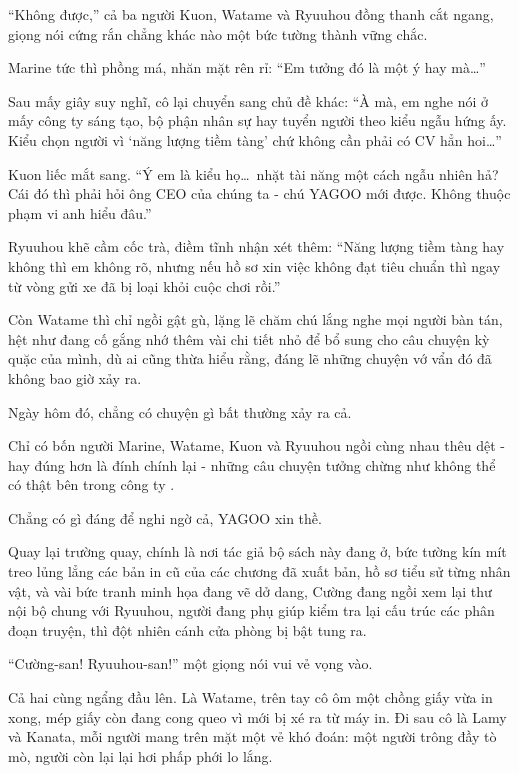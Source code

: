\documentclass[../main.tex]{subfiles}
\begin{document}
``Không được,'' cả ba người Kuon, Watame và Ryuuhou đồng thanh cắt ngang, giọng nói cứng rắn chẳng khác nào một bức tường thành vững chắc.

Marine tức thì phồng má, nhăn mặt rên rỉ: ``Em tưởng đó là một ý hay mà\dots''

Sau mấy giây suy nghĩ, cô lại chuyển sang chủ đề khác: ``À mà, em nghe nói ở mấy công ty sáng tạo, bộ phận nhân sự hay tuyển người theo kiểu ngẫu hứng ấy. Kiểu chọn người vì `năng lượng tiềm tàng' chứ không cần phải có CV hẳn hoi\dots''

Kuon liếc mắt sang. ``Ý em là kiểu họ\dots\ nhặt tài năng một cách ngẫu nhiên hả? Cái đó thì phải hỏi ông CEO của chúng ta - chú YAGOO mới được. Không thuộc phạm vi anh hiểu đâu.''

Ryuuhou khẽ cầm cốc trà, điềm tĩnh nhận xét thêm: ``Năng lượng tiềm tàng hay không thì em không rõ, nhưng nếu hồ sơ xin việc không đạt tiêu chuẩn thì ngay từ vòng gửi xe đã bị loại khỏi cuộc chơi rồi.''

Còn Watame thì chỉ ngồi gật gù, lặng lẽ chăm chú lắng nghe mọi người bàn tán, hệt như đang cố gắng nhớ thêm vài chi tiết nhỏ để bổ sung cho câu chuyện kỳ quặc của mình, dù ai cũng thừa hiểu rằng, đáng lẽ những chuyện vớ vẩn đó đã không bao giờ xảy ra.

Ngày hôm đó, chẳng có chuyện gì bất thường xảy ra cả.

Chỉ có bốn người Marine, Watame, Kuon và Ryuuhou ngồi cùng nhau thêu dệt - hay đúng hơn là đính chính lại - những câu chuyện tưởng chừng như không thể có thật bên trong công ty \hll.

Chẳng có gì đáng để nghi ngờ cả, YAGOO xin thề.

\ct

Quay lại trường quay, chính là nơi tác giả bộ sách này đang ở, bức tường kín mít treo lủng lẳng các bản in cũ của các chương đã xuất bản, hồ sơ tiểu sử từng nhân vật, và vài bức tranh minh họa đang vẽ dở dang, Cường đang ngồi xem lại thư nội bộ chung với Ryuuhou, người đang phụ giúp kiểm tra lại cấu trúc các phân đoạn truyện, thì đột nhiên cánh cửa phòng bị bật tung ra.

``Cường-san! Ryuuhou-san!'' một giọng nói vui vẻ vọng vào.

Cả hai cùng ngẩng đầu lên. Là Watame, trên tay cô ôm một chồng giấy vừa in xong, mép giấy còn đang cong queo vì mới bị xé ra từ máy in. Đi sau cô là Lamy và Kanata, mỗi người mang trên mặt một vẻ khó đoán: một người trông đầy tò mò, người còn lại lại hơi phấp phới lo lắng.
\end{document}
